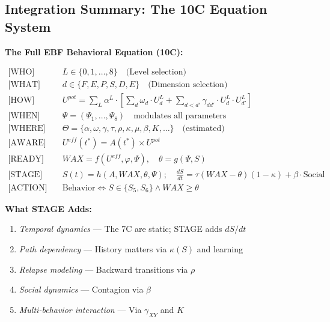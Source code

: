 \subsection{Integration Summary: The 10C Equation System}

\begin{tcolorbox}[colback=green!5!white, colframe=green!75!black,
    title=Complete 10C System Specification]

\textbf{The Full EBF Behavioral Equation (10C):}

\begin{align}
\text{[WHO]} \quad & L \in \{0, 1, \ldots, 8\} \quad \text{(Level selection)} \\[3pt]
\text{[WHAT]} \quad & d \in \{F, E, P, S, D, E\} \quad \text{(Dimension selection)} \\[3pt]
\text{[HOW]} \quad & U^{pot} = \sum_L \alpha^L \cdot \left[\sum_d \omega_d \cdot U^L_d + \sum_{d<d'} \gamma_{dd'} \cdot U^L_d \cdot U^L_{d'}\right] \\[3pt]
\text{[WHEN]} \quad & \Psi = (\Psi_1, \ldots, \Psi_8) \quad \text{modulates all parameters} \\[3pt]
\text{[WHERE]} \quad & \Theta = \{\alpha, \omega, \gamma, \tau, \rho, \kappa, \mu, \beta, K, \ldots\} \quad \text{(estimated)} \\[3pt]
\text{[AWARE]} \quad & U^{eff}(t^*) = A(t^*) \times U^{pot} \\[3pt]
\text{[READY]} \quad & WAX = f(U^{eff}, \varphi, \Psi), \quad \theta = g(\Psi, S) \\[3pt]
\text{[STAGE]} \quad & \boxed{S(t) = h(A, WAX, \theta, \Psi); \quad \frac{dS}{dt} = \tau(WAX - \theta)(1-\kappa) + \beta \cdot \text{Social}} \\[5pt]
\text{[ACTION]} \quad & \text{Behavior} \Leftrightarrow S \in \{S_5, S_6\} \land WAX \geq \theta
\end{align}

\textbf{What STAGE Adds:}
\begin{enumerate}[nosep]
\item \textit{Temporal dynamics} — The 7C are static; STAGE adds $dS/dt$
\item \textit{Path dependency} — History matters via $\kappa(S)$ and learning
\item \textit{Relapse modeling} — Backward transitions via $\rho$
\item \textit{Social dynamics} — Contagion via $\beta$
\item \textit{Multi-behavior interaction} — Via $\gamma_{XY}$ and $K$
\end{enumerate}

\end{tcolorbox}

